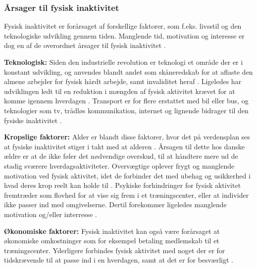 \subsubsection{Årsager til fysisk inaktivitet}
Fysisk inaktivitet er forårsaget af forskellige faktorer, som f.eks. livsstil og den teknologiske udvikling gennem tiden. Manglende tid,  motivation og interesse er dog en af de overordnet årsager til fysisk inaktivitet \citep{ottesen2005}.  

\textbf{Teknologisk:}  
Siden den industrielle revolution er teknologi et område der er i konstant udvikling, og anvendes blandt andet som skåneredskab for at aflaste den almene arbejder for fysisk hårdt arbejde, samt invaliditet heraf \citep{hallal2012}. 
Ligeledes har udviklingen ledt til en reduktion i mængden af fysisk aktivitet krævet for at komme igennem hverdagen \citep{hallal2012, motionsraad2007}. Transport er for flere erstattet med bil eller bus, og teknologier som tv, trådløs kommunikation, internet og lignende bidrager til den fysiske inaktivitet \citep{hallal2012}.  

\textbf{Kropslige faktorer:}
Alder er blandt disse faktorer, hvor det på verdensplan ses at fysiske inaktivitet stiger i takt med at alderen \citep{guthold2008}. 
Årsagen til dette hos danske ældre er at de ikke føler det nødvendige overskud, til at håndtere mere ud de stadig sværere hverdagsaktiviteter. 
Overvægtige oplever frygt og manglende motivation ved fysisk aktivitet, idet de forbinder det med ubehag og usikkerhed i hvad deres krop reelt kan holde til \citep{Ottesen2005}. 
Psykiske forhindringer for fysisk aktivitet fremtræder som flovhed for at vise sig frem i et træningscenter, eller at individer ikke passer ind med omgivelserne. 
Dertil forekommer ligeledes manglende motivation og/eller interresse \citep{Ottesen2005}.

\textbf{Økonomiske faktorer:}
Fysisk inaktivitet kan også være forårsaget at økonomiske omkostninger som for eksempel betaling medlemskab til et træningscenter. Yderligere forbindes fysisk aktivitet med noget der er for tidskrævende til at passe ind i en hverdagen, samt at det er for besværligt \citep{ottesen2005}.